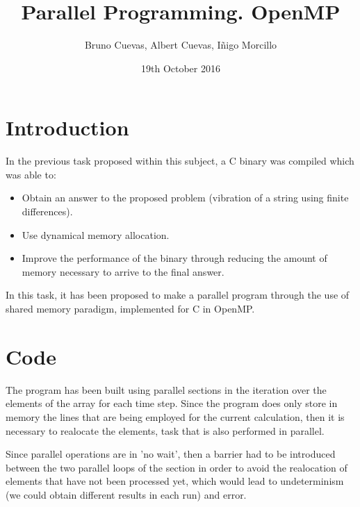 \documentclass{article}
\title{Parallel Programming. OpenMP}
\author{Bruno Cuevas, Albert Cuevas, Iñigo Morcillo}
\date{19th October 2016}
\begin{document}
\maketitle

\section {Introduction}
	In the previous task proposed within this subject, a C binary was compiled
	which was able to:
	\begin{itemize}
		\item Obtain an answer to the proposed problem (vibration of a string
		 using finite differences).
		\item Use dynamical memory allocation.
		\item Improve the performance of the binary through reducing the amount
		of memory necessary to arrive to the final answer.
	\end{itemize}
	In this task, it has been proposed to make a parallel program through the use
	of shared memory paradigm, implemented for C in OpenMP.

\section {Code}

	The program has been built using parallel sections in the iteration over
	the elements of the array for each time step. Since the program does
	only store in memory the lines that are being employed for the current
	calculation, then it is necessary to realocate the elements, task that is
	also performed in parallel.

	Since parallel operations are in 'no wait', then a barrier had to be
	introduced between the two parallel loops of the section in order to avoid
	the realocation of elements that have not been processed yet, which would
	lead to undeterminism (we could obtain different results in
	each run) and error.
\end{document}
